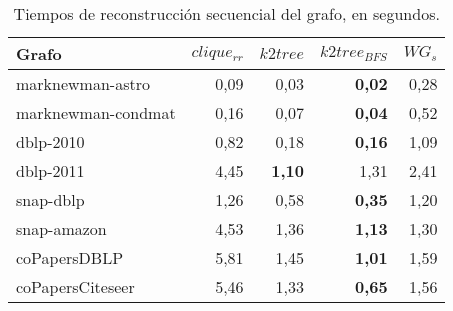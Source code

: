 \begin{table}
	\caption{Tiempos de reconstrucción secuencial del grafo, en segundos.}
	\label{table:timesSecuencial}
	\centering
	\begin{tabular}{l|r|r|r|r}
		\toprule
		Grafo & $clique_{rr}$ & $k2tree$ & $k2tree_{BFS}$ & $WG_{s}$ \\
        \midrule
        marknewman-astro & 0,09 & 0,03 & \textbf{0,02} & 0,28 \\
        marknewman-condmat & 0,16 & 0,07 & \textbf{0,04} & 0,52 \\
        dblp-2010 & 0,82 & 0,18 & \textbf{0,16} & 1,09 \\
        dblp-2011 & 4,45 & \textbf{1,10} & 1,31 & 2,41 \\
        snap-dblp & 1,26 & 0,58 & \textbf{0,35} & 1,20 \\
        snap-amazon & 4,53 & 1,36 & \textbf{1,13} & 1,30 \\
        coPapersDBLP & 5,81 & 1,45 & \textbf{1,01} & 1,59 \\
        coPapersCiteseer & 5,46 & 1,33 & \textbf{0,65} & 1,56 \\
        \bottomrule
	\end{tabular}
\end{table}


